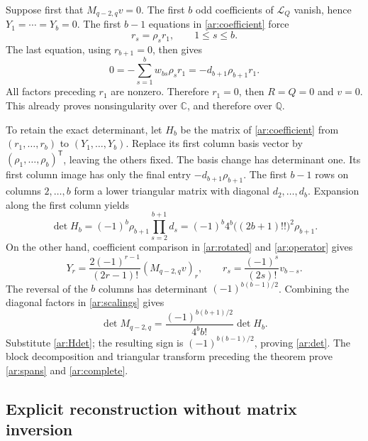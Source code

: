 \documentclass[11pt,a4paper]{article}
\numberwithin{equation}{section}
\theoremstyle{definition}
\theoremstyle{remark}
\begin{document}
Suppose first that $M_{q-2,q}v=0$. The first $b$ odd coefficients
of $\mathcal L_Q$ vanish, hence $Y_1=\cdots=Y_b=0$.
The first $b-1$ equations in \eqref{ar:coefficient} force
\[
                   r_s=\rho_sr_1,\qquad 1\le s\le b.
\]
The last equation, using $r_{b+1}=0$, then gives
\[
           0=-\sum_{s=1}^bw_{bs}\rho_sr_1
             =-d_{b+1}\rho_{b+1}r_1.
\]
All factors preceding $r_1$ are nonzero. Therefore $r_1=0$, then
$R=Q=0$ and $v=0$. This already proves nonsingularity over
$\mathbb C$, and therefore over $\mathbb Q$.

To retain the exact determinant, let $H_b$ be the matrix of
\eqref{ar:coefficient} from $(r_1,\ldots,r_b)$ to
$(Y_1,\ldots,Y_b)$. Replace its first column basis vector by
$(\rho_1,\ldots,\rho_b)^{\mathsf T}$, leaving the others fixed.
The basis change has determinant one. Its first column image has
only the final entry $-d_{b+1}\rho_{b+1}$. The first $b-1$ rows
on columns $2,\ldots,b$ form a lower triangular matrix with diagonal
$d_2,\ldots,d_b$. Expansion along the first column yields
\begin{equation}\label{ar:Hdet}
 \det H_b=(-1)^b\rho_{b+1}\prod_{s=2}^{b+1}d_s
    =(-1)^b4^b\bigl((2b+1)!!\bigr)^2\rho_{b+1}.
\end{equation}
On the other hand, coefficient comparison in \eqref{ar:rotated}
and \eqref{ar:operator} gives
\begin{equation}\label{ar:scalings}
 Y_r=\frac{2(-1)^{r-1}}{(2r-1)!}(M_{q-2,q}v)_r,
 \qquad r_s=\frac{(-1)^s}{(2s)!}v_{b-s}.
\end{equation}
The reversal of the $b$ columns has determinant
$(-1)^{b(b-1)/2}$. Combining the diagonal factors in
\eqref{ar:scalings} gives
\[
 \det M_{q-2,q}
     =\frac{(-1)^{b(b+1)/2}}{4^bb!}\det H_b.
\]
Substitute \eqref{ar:Hdet}; the resulting sign is
$(-1)^{b(b-1)/2}$, proving \eqref{ar:det}.
The block decomposition and triangular transform preceding the theorem
prove \eqref{ar:spans} and \eqref{ar:complete}.

\subsection{Explicit reconstruction without matrix inversion}
\end{document}
